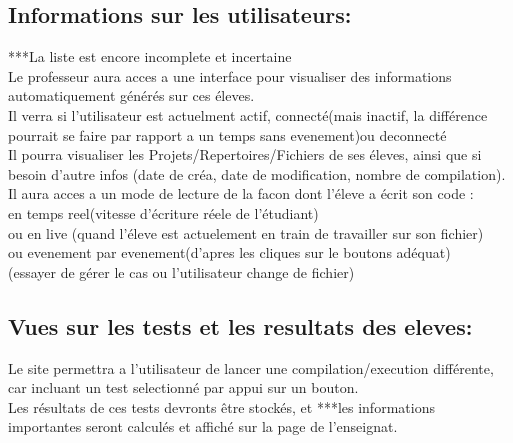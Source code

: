 \documentclass[12pt,a4paper,twoside]{article}
\begin{document}
\subsection{Informations sur les utilisateurs:}
***La liste est encore incomplete et incertaine\\
Le professeur aura acces a une interface pour visualiser des informations automatiquement générés sur ces éleves.\\
Il verra si l'utilisateur est actuelment actif, connecté(mais inactif, la différence pourrait se faire par rapport a un temps sans evenement)ou deconnecté\\
Il pourra visualiser les Projets/Repertoires/Fichiers de ses éleves, ainsi que si besoin d'autre infos (date de créa, date de modification, nombre de compilation).\\
Il aura acces a un mode de lecture de la facon dont l'éleve a écrit son code :\\
en temps reel(vitesse d'écriture réele de l'étudiant) \\
ou en live (quand l'éleve est actuelement en train de travailler sur son fichier) \\
ou evenement par evenement(d'apres les cliques sur le boutons adéquat)\\
(essayer de gérer le cas ou l'utilisateur change de fichier)\\
\subsection{Vues sur les tests et les resultats des eleves:}
Le site permettra a l'utilisateur de lancer une compilation/execution différente, car incluant un test selectionné par appui sur un bouton.\\
Les résultats de ces tests devronts être stockés, et ***les informations importantes seront calculés et affiché sur la page de l'enseignat.\\
\end{document}
